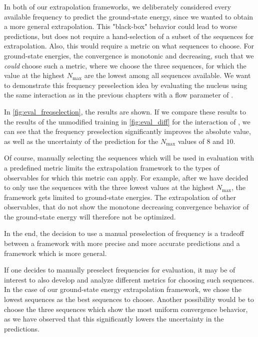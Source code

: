 In both of our extrapolation frameworks, we deliberately considered every available frequency to predict the ground-state energy, since we wanted to obtain a more general extrapolation. This "black-box" behavior could lead to worse predictions, but does not require a hand-selection of a subset of the sequences for extrapolation. Also, this would require a metric on what sequences to choose. For ground-state energies, the convergence is monotonic and decreasing, such that we \textit{could} choose such a metric, where we choose the three sequences, for which the value at the highest $N_\mathrm{max}$ are the lowest among all sequences available. We want to demonstrate this frequency preselection idea by evaluating the  nucleus using the same interaction as in the previous chapters with a flow parameter of .

In \autoref{fig:eval_freqselection}, the results are shown. If we compare these results to the results of the unmodified training in \autoref{fig:eval_diff} for the  interaction of , we can see that the frequency preselection significantly improves the absolute value, as well as the uncertainty of the prediction for the $N_\mathrm{max}$ values of $8$ and $10$.

Of course, manually selecting the sequences which will be used in evaluation with a predefined metric limits the extrapolation framework to the types of observables for which this metric can apply. For example, after we have decided to only use the sequences with the three lowest values at the highest $N_\mathrm{max}$, the framework gets limited to ground-state energies. The extrapolation of other observables, that do not show the monotone decreasing convergence behavior of the ground-state energy will therefore not be optimized.

In the end, the decision to use a manual preselection of frequency is a tradeoff between a framework with more precise and more accurate predictions and a framework which is more general.

If one decides to manually preselect frequencies for evaluation, it may be of interest to also develop and analyze different metrics for choosing such sequences. In the case of our ground-state energy extrapolation framework, we chose the lowest sequences as the best sequences to choose. Another possibility would be to choose the three sequences which show the most uniform convergence behavior, as we have observed that this significantly lowers the uncertainty in the predictions.


